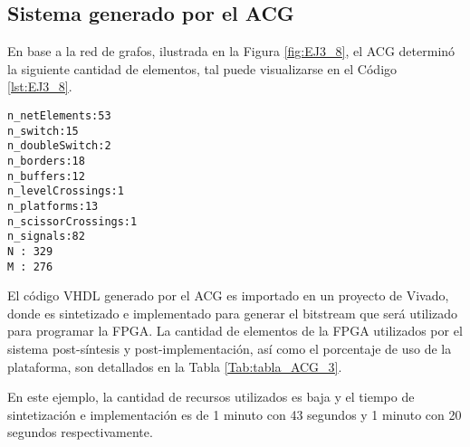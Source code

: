 \subsection{Sistema generado por el ACG}

En base a la red de grafos, ilustrada en la Figura \ref{fig:EJ3_8}, el ACG determinó la siguiente cantidad de elementos, tal puede visualizarse en el Código \ref{lst:EJ3_8}.

\begin{lstlisting}[language = {}, caption = Cantidad de elementos a implementar por el ACG, label = {lst:EJ3_8}]
n_netElements:53
n_switch:15
n_doubleSwitch:2
n_borders:18
n_buffers:12
n_levelCrossings:1
n_platforms:13
n_scissorCrossings:1
n_signals:82
N : 329
M : 276
\end{lstlisting}

El código VHDL generado por el ACG es importado en un proyecto de Vivado, donde es sintetizado e implementado para generar el bitstream que será utilizado para programar la FPGA. La cantidad de elementos de la FPGA utilizados por el sistema post-síntesis y post-implementación, así como el porcentaje de uso de la plataforma, son detallados en la Tabla \ref{Tab:tabla_ACG_3}.

\begin{table}[H]
	{
		\caption{Síntesis e implementación del ejemplo 3 generado por el ACG.}
		\label{Tab:tabla_ACG_3}
		\centering
		\begin{center}
		\end{center}
	}    
\end{table}

En este ejemplo, la cantidad de recursos utilizados es baja y el tiempo de sintetización e implementación es de 1 minuto con 43 segundos y 1 minuto con 20 segundos respectivamente.